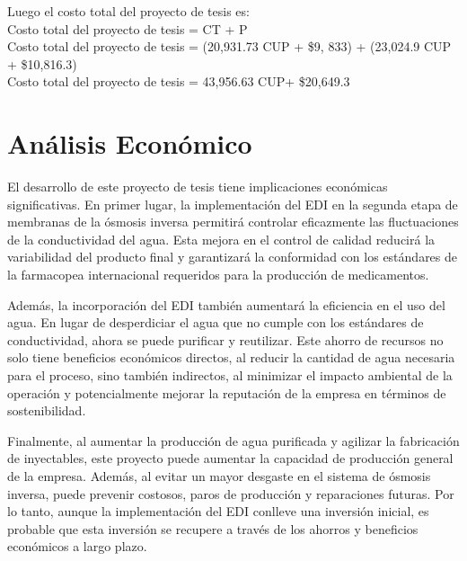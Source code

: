 Luego el costo total del proyecto de tesis es:\\
Costo total del proyecto de tesis = CT + P                                                   \\
Costo total del proyecto de tesis = (20,931.73 CUP + \$9, 833) + (23,024.9 CUP + \$10,816.3) \\
Costo total del proyecto de tesis = 43,956.63 CUP+ \$20,649.3

\section{Análisis Económico}
El desarrollo de este proyecto de tesis tiene implicaciones económicas significativas. En primer lugar, la implementación del EDI en la segunda etapa de membranas de la ósmosis inversa permitirá controlar eficazmente las fluctuaciones de la conductividad del agua. Esta mejora en el control de calidad reducirá la variabilidad del producto final y garantizará la conformidad con los estándares de la farmacopea internacional requeridos para la producción de medicamentos.

Además, la incorporación del EDI también aumentará la eficiencia en el uso del agua. En lugar de desperdiciar el agua que no cumple con los estándares de conductividad, ahora se puede purificar y reutilizar. Este ahorro de recursos no solo tiene beneficios económicos directos, al reducir la cantidad de agua necesaria para el proceso, sino también indirectos, al minimizar el impacto ambiental de la operación y potencialmente mejorar la reputación de la empresa en términos de sostenibilidad.

Finalmente, al aumentar la producción de agua purificada y agilizar la fabricación de inyectables, este proyecto puede aumentar la capacidad de producción general de la empresa. Además, al evitar un mayor desgaste en el sistema de ósmosis inversa, puede prevenir costosos, paros de producción y reparaciones futuras. Por lo tanto, aunque la implementación del EDI conlleve una inversión inicial, es probable que esta inversión se recupere a través de los ahorros y beneficios económicos a largo plazo.








